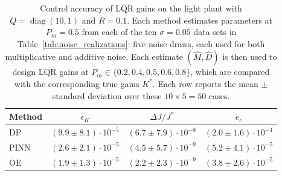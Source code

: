 \begin{table}[!t]
\centering
\caption{Control accuracy of LQR gains on the light plant with
$Q=\operatorname{diag}(10,1)$ and $R=0.1$.
Each method estimates parameters at $P_m=0.5$ from each of the ten
$\sigma=0.05$ data sets in Table~\ref{tab:noise_realizations}:
five noise draws, each used for both multiplicative and additive noise.
Each estimate $(\hat M,\hat D)$ is then used to design LQR gains at
$P_m\in\{0.2,0.4,0.5,0.6,0.8\}$, which are compared with
the corresponding true gains $K^*$.
Each row reports the mean $\pm$ standard deviation over these
$10\times5=50$ cases.}
\label{tab:op-seed}
\footnotesize
\setlength{\tabcolsep}{3pt}
\begin{tabular}{lccc}
\toprule
Method & $\epsilon_K$ & $\Delta J/J^*$ & $e_c$ \\
\midrule
DP & $(9.9\pm8.1){\cdot}10^{-5}$ & $(6.7\pm7.9){\cdot}10^{-8}$ & $(2.0\pm1.6){\cdot}10^{-4}$ \\
PINN & $(2.6\pm2.1){\cdot}10^{-5}$ & $(4.5\pm5.7){\cdot}10^{-9}$ & $(5.2\pm4.1){\cdot}10^{-5}$ \\
OE & $(1.9\pm1.3){\cdot}10^{-5}$ & $(2.2\pm2.3){\cdot}10^{-9}$ & $(3.8\pm2.6){\cdot}10^{-5}$ \\
\bottomrule
\end{tabular}
\end{table}
